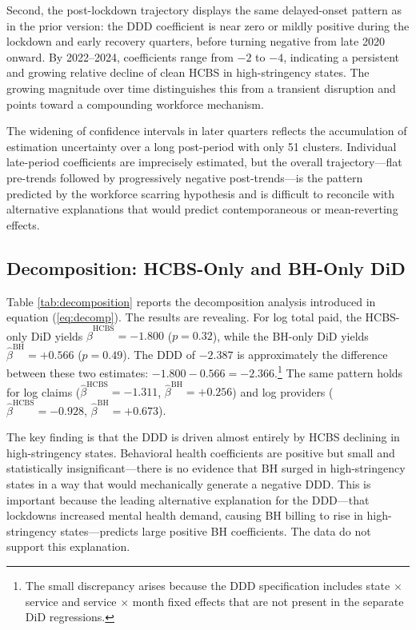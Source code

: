 \documentclass[12pt]{article}
\begin{document}
Second, the post-lockdown trajectory displays the same delayed-onset pattern as in the prior version: the DDD coefficient is near zero or mildly positive during the lockdown and early recovery quarters, before turning negative from late 2020 onward. By 2022--2024, coefficients range from $-2$ to $-4$, indicating a persistent and growing relative decline of clean HCBS in high-stringency states. The growing magnitude over time distinguishes this from a transient disruption and points toward a compounding workforce mechanism.

The widening of confidence intervals in later quarters reflects the accumulation of estimation uncertainty over a long post-period with only 51 clusters. Individual late-period coefficients are imprecisely estimated, but the overall trajectory---flat pre-trends followed by progressively negative post-trends---is the pattern predicted by the workforce scarring hypothesis and is difficult to reconcile with alternative explanations that would predict contemporaneous or mean-reverting effects.

\subsection{Decomposition: HCBS-Only and BH-Only DiD}



Table \ref{tab:decomposition} reports the decomposition analysis introduced in equation (\ref{eq:decomp}). The results are revealing. For log total paid, the HCBS-only DiD yields $\hat{\beta}^{\text{HCBS}} = -1.800$ ($p = 0.32$), while the BH-only DiD yields $\hat{\beta}^{\text{BH}} = +0.566$ ($p = 0.49$). The DDD of $-2.387$ is approximately the difference between these two estimates: $-1.800 - 0.566 = -2.366$.\footnote{The small discrepancy arises because the DDD specification includes state $\times$ service and service $\times$ month fixed effects that are not present in the separate DiD regressions.} The same pattern holds for log claims ($\hat{\beta}^{\text{HCBS}} = -1.311$, $\hat{\beta}^{\text{BH}} = +0.256$) and log providers ($\hat{\beta}^{\text{HCBS}} = -0.928$, $\hat{\beta}^{\text{BH}} = +0.673$).

The key finding is that the DDD is driven almost entirely by HCBS declining in high-stringency states. Behavioral health coefficients are positive but small and statistically insignificant---there is no evidence that BH surged in high-stringency states in a way that would mechanically generate a negative DDD. This is important because the leading alternative explanation for the DDD---that lockdowns increased mental health demand, causing BH billing to rise in high-stringency states---predicts large positive BH coefficients. The data do not support this explanation.
\end{document}
